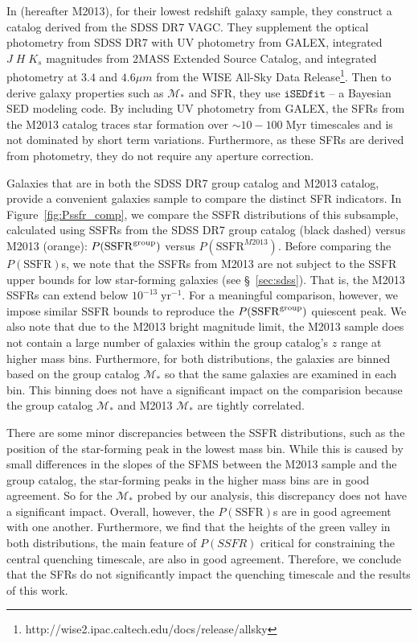 \documentclass[iop,apj,tighten,twocolappendix,numberedappendix]{emulateapj}
\begin{document}
In \cite{Moustakas:2013aa} (hereafter M2013), for their lowest redshift galaxy 
sample, they construct a catalog derived from the SDSS DR7 VAGC. 
They supplement the optical photometry from SDSS DR7 with 
UV photometry from GALEX, integrated $J\;H\;K_s$ magnitudes 
from 2MASS Extended Source Catalog, and integrated photometry 
at $3.4$ and $4.6\mu m$ from the WISE All-Sky Data Release\footnote{http://wise2.ipac.caltech.edu/docs/release/allsky}.
Then to derive galaxy properties such as $\mathcal{M}_*$ and
SFR, they use $\mathtt{iSEDfit}$ -- a Bayesian SED modeling code. 
By including UV photometry from GALEX, the SFRs from the 
M2013 catalog traces star formation over 
$\sim 10 - 100\;\mathrm{Myr}$ timescales and is not dominated
by short term variations. Furthermore, as these SFRs are 
derived from photometry, they do not require any aperture 
correction. 

Galaxies that are in both the SDSS DR7 group catalog and 
M2013 catalog, provide a convenient galaxies sample
to compare the distinct SFR indicators. In Figure~\ref{fig:Pssfr_comp}, 
we compare the SSFR distributions of this subsample, 
calculated using SSFRs from the SDSS DR7 group catalog (black dashed) 
versus M2013 (orange): $P(\mathrm{SSFR}^{\rm group})$ versus 
$P(\mathrm{SSFR}^{M2013})$. Before comparing the 
$P(\mathrm{SSFR})$s, we note that the SSFRs from M2013 are 
not subject to the \cite{Brinchmann:2004aa} SSFR upper bounds 
for low star-forming galaxies (see \S~\ref{sec:sdss}). 
That is, the M2013 SSFRs can extend
below $10^{-13}\;\mathrm{yr}^{-1}$. For a meaningful comparison, 
however, we impose similar SSFR bounds to reproduce the 
$P(\mathrm{SSFR}^{\rm group})$ quiescent peak. We also note 
that due to the M2013 bright magnitude limit, the M2013 sample 
does not contain a large number of galaxies within the group 
catalog's $z$ range at higher mass bins. Furthermore, for
both distributions, the galaxies are binned based on the
group catalog $\mathcal{M}_*$ so that the same galaxies are
examined in each bin. This binning does not have a significant
impact on the comparision because the group catalog $\mathcal{M}_*$ 
and M2013 $\mathcal{M}_*$ are tightly correlated. 

There are some minor discrepancies between the SSFR distributions, 
such as the position of the star-forming peak in the lowest mass 
bin. While this is caused by small
differences in the slopes of the SFMS between the M2013 sample 
and the group catalog, the star-forming peaks in the higher mass bins are 
in good agreement. So for the $\mathcal{M}_*$ probed by our analysis, 
this discrepancy does not have a significant impact. Overall, however, 
the $P(\mathrm{SSFR})$s are in good agreement with one another. 
Furthermore, we find that the heights of the green valley in both 
distributions, the main feature of $P(SSFR)$ critical for 
constraining the central quenching timescale, are also in good 
agreement. Therefore, we conclude that the \cite{Brinchmann:2004aa} SFRs
do not significantly impact the quenching timescale and the results of
this work. 
\end{document}
